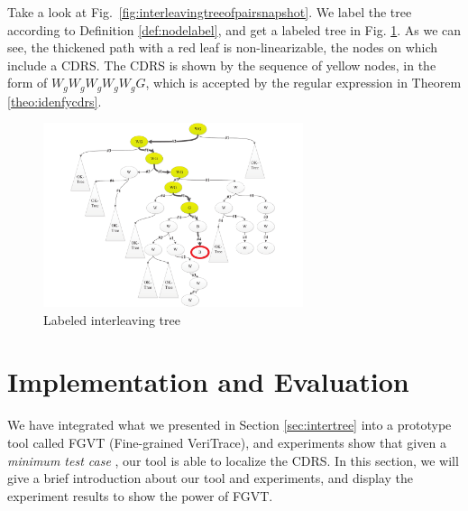\documentclass[runningheads]{llncs}
\begin{document}
\begin{example}
Take a look at Fig.~\ref{fig:interleavingtreeofpairsnapshot}.  We label the tree according to Definition \ref{def:nodelabel}, and get a labeled tree in Fig. \ref{fig:labeledinterleavingtreepss}.  As we can see, the thickened path with a red leaf is non-linearizable, the nodes on which include a CDRS. The CDRS is shown by the sequence of yellow nodes, in the form of $\mathit{W_gW_gW_gW_gW_gG}$, which is accepted by the regular expression in Theorem \ref{theo:idenfycdrs}.

\end{example}


\begin{figure}
\centering
\includegraphics[width = 3in]{psslabeltree.pdf}
\caption{Labeled interleaving tree}\label{fig:labeledinterleavingtreepss}
\end{figure}








\section{Implementation and Evaluation}\label{sec:implementation}
We have integrated what we presented in Section \ref{sec:intertree} into a prototype tool called FGVT (Fine-grained VeriTrace), and experiments show that given a \textit{minimum test case} \cite{DBLP:conf/seke/ZhangWZ17}, our tool is able to localize the CDRS. In this section, we will give a brief introduction about our tool and experiments, and display the experiment results to show the power of FGVT.
\end{document}
